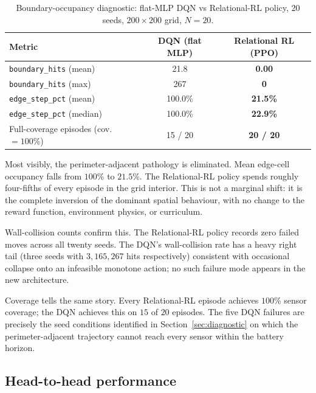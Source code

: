 \begin{table}[H]
\centering
\caption{Boundary-occupancy diagnostic: flat-MLP DQN vs Relational-RL policy, 20 seeds, $200{\times}200$ grid, $N{=}20$.}
\label{tab:boundary_compare}
\begin{tabular}{lcc}
\toprule
\textbf{Metric}                          & \textbf{DQN (flat MLP)} & \textbf{Relational RL (PPO)} \\
\midrule
\texttt{boundary\_hits} (mean)           & 21.8            & \textbf{0.00}              \\
\texttt{boundary\_hits} (max)            & 267             & \textbf{0}                 \\
\texttt{edge\_step\_pct} (mean)          & 100.0\%         & \textbf{21.5\%}            \\
\texttt{edge\_step\_pct} (median)        & 100.0\%         & \textbf{22.9\%}            \\
Full-coverage episodes (cov. $= 100\%$)  & 15 / 20         & \textbf{20 / 20}           \\
\bottomrule
\end{tabular}
\end{table}

Most visibly, the perimeter-adjacent pathology is eliminated. Mean edge-cell occupancy falls from $100\%$ to $21.5\%$. The Relational-RL
policy spends roughly four-fifths of every episode in the grid interior.
This is not a marginal shift: it is the complete inversion of the dominant
spatial behaviour, with no change to the reward function, environment
physics, or curriculum.

Wall-collision counts confirm this. The Relational-RL policy records zero failed moves across all twenty seeds.
The DQN's wall-collision rate has a heavy right tail (three seeds with
$3, 165, 267$ hits respectively) consistent with occasional collapse onto
an infeasible monotone action; no such failure mode appears in the new
architecture.

Coverage tells the same story. Every Relational-RL episode achieves $100\%$ sensor coverage; the DQN
achieves this on $15$ of $20$ episodes. The five DQN failures are precisely
the seed conditions identified in Section~\ref{sec:diagnostic} on which the
perimeter-adjacent trajectory cannot reach every sensor within the battery
horizon.

\subsection{Head-to-head performance}
\label{sec:relational_headtohead}

